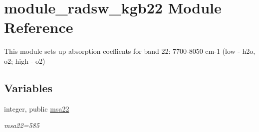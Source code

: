 \hypertarget{namespacemodule__radsw__kgb22}{}\section{module\+\_\+radsw\+\_\+kgb22 Module Reference}
\label{namespacemodule__radsw__kgb22}


This module sets up absorption coeffients for band 22\+: 7700-\/8050 cm-\/1 (low -\/ h2o, o2; high -\/ o2)  


\subsection*{Variables}
\begin{DoxyCompactItemize}
\item 
\mbox{\label{namespacemodule__radsw__kgb22_a4134c2cd3b31db5e0adb5c3c2ad87905}} 
integer, public \hyperlink{namespacemodule__radsw__kgb22_a4134c2cd3b31db5e0adb5c3c2ad87905}{msa22}
\begin{DoxyCompactList}\small\item\em msa22=585 \end{DoxyCompactList}\end{DoxyCompactItemize}
